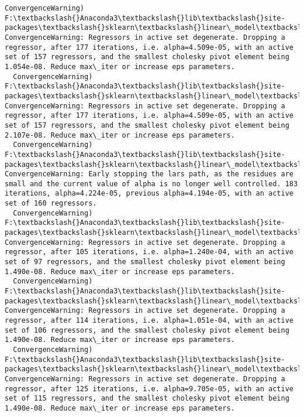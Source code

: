 \documentclass[11pt]{article}
\begin{document}
\begin{Verbatim}[commandchars=\\\{\}]
  ConvergenceWarning)
F:\textbackslash{}Anaconda3\textbackslash{}lib\textbackslash{}site-packages\textbackslash{}sklearn\textbackslash{}linear\_model\textbackslash{}least\_angle.py:313: ConvergenceWarning: Regressors in active set degenerate. Dropping a regressor, after 177 iterations, i.e. alpha=4.509e-05, with an active set of 157 regressors, and the smallest cholesky pivot element being 1.054e-08. Reduce max\_iter or increase eps parameters.
  ConvergenceWarning)
F:\textbackslash{}Anaconda3\textbackslash{}lib\textbackslash{}site-packages\textbackslash{}sklearn\textbackslash{}linear\_model\textbackslash{}least\_angle.py:313: ConvergenceWarning: Regressors in active set degenerate. Dropping a regressor, after 177 iterations, i.e. alpha=4.509e-05, with an active set of 157 regressors, and the smallest cholesky pivot element being 2.107e-08. Reduce max\_iter or increase eps parameters.
  ConvergenceWarning)
F:\textbackslash{}Anaconda3\textbackslash{}lib\textbackslash{}site-packages\textbackslash{}sklearn\textbackslash{}linear\_model\textbackslash{}least\_angle.py:339: ConvergenceWarning: Early stopping the lars path, as the residues are small and the current value of alpha is no longer well controlled. 183 iterations, alpha=4.224e-05, previous alpha=4.194e-05, with an active set of 160 regressors.
  ConvergenceWarning)
F:\textbackslash{}Anaconda3\textbackslash{}lib\textbackslash{}site-packages\textbackslash{}sklearn\textbackslash{}linear\_model\textbackslash{}least\_angle.py:313: ConvergenceWarning: Regressors in active set degenerate. Dropping a regressor, after 105 iterations, i.e. alpha=1.240e-04, with an active set of 97 regressors, and the smallest cholesky pivot element being 1.490e-08. Reduce max\_iter or increase eps parameters.
  ConvergenceWarning)
F:\textbackslash{}Anaconda3\textbackslash{}lib\textbackslash{}site-packages\textbackslash{}sklearn\textbackslash{}linear\_model\textbackslash{}least\_angle.py:313: ConvergenceWarning: Regressors in active set degenerate. Dropping a regressor, after 114 iterations, i.e. alpha=1.051e-04, with an active set of 106 regressors, and the smallest cholesky pivot element being 1.490e-08. Reduce max\_iter or increase eps parameters.
  ConvergenceWarning)
F:\textbackslash{}Anaconda3\textbackslash{}lib\textbackslash{}site-packages\textbackslash{}sklearn\textbackslash{}linear\_model\textbackslash{}least\_angle.py:313: ConvergenceWarning: Regressors in active set degenerate. Dropping a regressor, after 125 iterations, i.e. alpha=9.705e-05, with an active set of 115 regressors, and the smallest cholesky pivot element being 1.490e-08. Reduce max\_iter or increase eps parameters.

\end{Verbatim}
\end{document}
